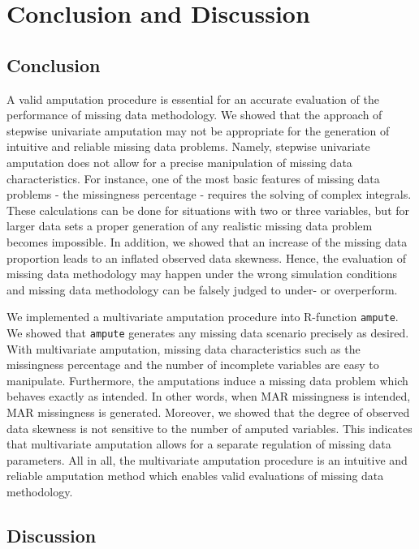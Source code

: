 \documentclass[11pt,a4paper]{article}
\newcommand{\code}[1]{\texttt{#1}}
\begin{document}
\section{Conclusion and Discussion}\label{conclusion}

\subsection{\normalsize Conclusion}

A valid amputation procedure is essential for an accurate evaluation of the performance of missing data methodology. We showed that the approach of stepwise univariate amputation may not be appropriate for the generation of intuitive and reliable missing data problems. Namely, stepwise univariate amputation does not allow for a precise manipulation of missing data characteristics. For instance, one of the most basic features of missing data problems - the missingness percentage - requires the solving of complex integrals. These calculations can be done for situations with two or three variables, but for larger data sets a proper generation of any realistic missing data problem becomes impossible. In addition, we showed that an increase of the missing data proportion leads to an inflated observed data skewness. Hence, the evaluation of missing data methodology may happen under the wrong simulation conditions and missing data methodology can be falsely judged to under- or overperform. 

We implemented a multivariate amputation procedure into R-function \code{ampute}. We showed that \code{ampute} generates any missing data scenario precisely as desired. With multivariate amputation, missing data characteristics such as the missingness percentage and the number of incomplete variables are easy to manipulate. Furthermore, the amputations induce a missing data problem which behaves exactly as intended. In other words, when MAR missingness is intended, MAR missingness is generated. Moreover, we showed that the degree of observed data skewness is not sensitive to the number of amputed variables. This indicates that multivariate amputation allows for a separate regulation of missing data parameters. All in all, the multivariate amputation procedure is an intuitive and reliable amputation method which enables valid evaluations of missing data methodology. 

\subsection{\normalsize Discussion}
\end{document}
